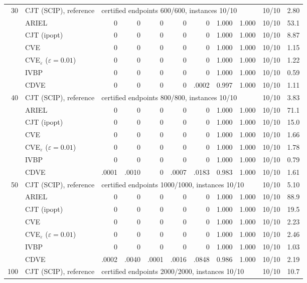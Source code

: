 \begin{table}[htbp]
\begin{tabular}{rlrrrrrrrlr}
\midrule
30 & CJT (SCIP), reference & \multicolumn{7}{l}{certified endpoints 600/600, instances 10/10} & 10/10 & 2.80 \\
 & ARIEL & 0 & 0 & 0 & 0 & 0 & 1.000 & 1.000 & 10/10 & 53.1 \\
 & CJT (ipopt) & 0 & 0 & 0 & 0 & 0 & 1.000 & 1.000 & 10/10 & 8.87 \\
 & CVE & 0 & 0 & 0 & 0 & 0 & 1.000 & 1.000 & 10/10 & 1.15 \\
 & CVE$_\varepsilon$ ($\varepsilon{=}0.01$) & 0 & 0 & 0 & 0 & 0 & 1.000 & 1.000 & 10/10 & 1.22 \\
 & IVBP & 0 & 0 & 0 & 0 & 0 & 1.000 & 1.000 & 10/10 & 0.59 \\
 & CDVE & 0 & 0 & 0 & 0 & .0002 & 0.997 & 1.000 & 10/10 & 1.11 \\
\midrule
40 & CJT (SCIP), reference & \multicolumn{7}{l}{certified endpoints 800/800, instances 10/10} & 10/10 & 3.83 \\
 & ARIEL & 0 & 0 & 0 & 0 & 0 & 1.000 & 1.000 & 10/10 & 71.1 \\
 & CJT (ipopt) & 0 & 0 & 0 & 0 & 0 & 1.000 & 1.000 & 10/10 & 15.0 \\
 & CVE & 0 & 0 & 0 & 0 & 0 & 1.000 & 1.000 & 10/10 & 1.66 \\
 & CVE$_\varepsilon$ ($\varepsilon{=}0.01$) & 0 & 0 & 0 & 0 & 0 & 1.000 & 1.000 & 10/10 & 1.78 \\
 & IVBP & 0 & 0 & 0 & 0 & 0 & 1.000 & 1.000 & 10/10 & 0.79 \\
 & CDVE & .0001 & .0010 & 0 & .0007 & .0183 & 0.983 & 1.000 & 10/10 & 1.61 \\
\midrule
50 & CJT (SCIP), reference & \multicolumn{7}{l}{certified endpoints 1000/1000, instances 10/10} & 10/10 & 5.10 \\
 & ARIEL & 0 & 0 & 0 & 0 & 0 & 1.000 & 1.000 & 10/10 & 88.9 \\
 & CJT (ipopt) & 0 & 0 & 0 & 0 & 0 & 1.000 & 1.000 & 10/10 & 19.5 \\
 & CVE & 0 & 0 & 0 & 0 & 0 & 1.000 & 1.000 & 10/10 & 2.23 \\
 & CVE$_\varepsilon$ ($\varepsilon{=}0.01$) & 0 & 0 & 0 & 0 & 0 & 1.000 & 1.000 & 10/10 & 2.46 \\
 & IVBP & 0 & 0 & 0 & 0 & 0 & 1.000 & 1.000 & 10/10 & 1.03 \\
 & CDVE & .0002 & .0040 & .0001 & .0016 & .0848 & 0.986 & 1.000 & 10/10 & 2.19 \\
\midrule
100 & CJT (SCIP), reference & \multicolumn{7}{l}{certified endpoints 2000/2000, instances 10/10} & 10/10 & 10.7 \\

\end{tabular}
\end{table}
